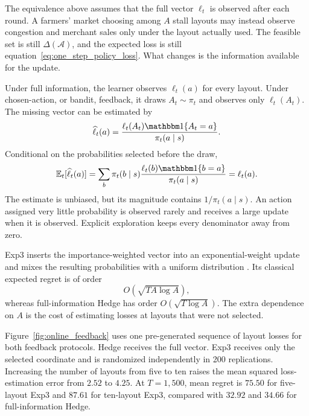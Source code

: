 The equivalence above assumes that the full vector $\ell_t$ is observed after each round. A farmers' market choosing among $A$ stall layouts may instead observe congestion and merchant sales only under the layout actually used. The feasible set is still $\Delta(\mathcal A)$, and the expected loss is still equation~\eqref{eq:one_step_policy_loss}. What changes is the information available for the update.

Under full information, the learner observes $\ell_t(a)$ for every layout. Under chosen-action, or bandit, feedback, it draws $A_t\sim\pi_t$ and observes only $\ell_t(A_t)$. The missing vector can be estimated by
\begin{equation}
\widehat\ell_t(a)
=
\frac{\ell_t(A_t)\indicator{A_t=a}}
{\pi_t(a\mid s)}.
\label{eq:online_importance_loss}
\end{equation}
Conditional on the probabilities selected before the draw,
\begin{equation}
\mathbb E_t[\widehat\ell_t(a)]
=
\sum_b\pi_t(b\mid s)
\frac{\ell_t(b)\indicator{b=a}}{\pi_t(a\mid s)}
=
\ell_t(a).
\label{eq:online_importance_unbiased}
\end{equation}
The estimate is unbiased, but its magnitude contains $1/\pi_t(a\mid s)$. An action assigned very little probability is observed rarely and receives a large update when it is observed. Explicit exploration keeps every denominator away from zero.

Exp3 inserts the importance-weighted vector into an exponential-weight update and mixes the resulting probabilities with a uniform distribution \citep{auer2002nonstochastic}. Its classical expected regret is of order
\begin{equation}
O\!\left(\sqrt{TA\log A}\right),
\label{eq:exp3_regret_order}
\end{equation}
whereas full-information Hedge has order $O(\sqrt{T\log A})$. The extra dependence on $A$ is the cost of estimating losses at layouts that were not selected.

Figure~\ref{fig:online_feedback} uses one pre-generated sequence of layout losses for both feedback protocols. Hedge receives the full vector. Exp3 receives only the selected coordinate and is randomized independently in 200 replications. Increasing the number of layouts from five to ten raises the mean squared loss-estimation error from $2.52$ to $4.25$. At $T=1{,}500$, mean regret is $75.50$ for five-layout Exp3 and $87.61$ for ten-layout Exp3, compared with $32.92$ and $34.66$ for full-information Hedge.

